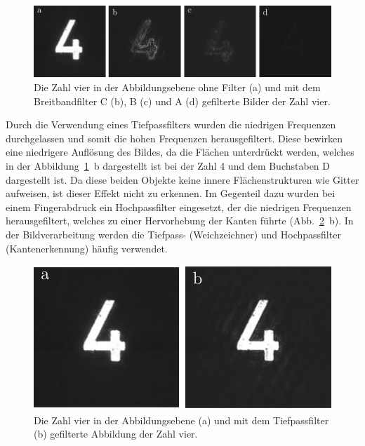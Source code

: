\begin{figure}[h]
	\centering
	\includegraphics{images/Regina/abb22.pdf}
	\caption[Zahl 4 mit Breitbandfiltern]{
		Die Zahl vier in  der Abbildungsebene ohne Filter (a) und mit dem Breitbandfilter C (b), B (c) und A (d) gefilterte Bilder der Zahl vier.
	}
	\label{fig:vier_mit_breitband}
\end{figure}

Durch die Verwendung eines Tiefpassfilters wurden die niedrigen Frequenzen durchgelassen und somit die hohen Frequenzen herausgefiltert. Diese bewirken eine niedrigere Auflösung des
Bildes, da die Flächen unterdrückt werden, welches in der Abbildung~\ref{fig:vier_mit_breitband}~b dargestellt ist bei der Zahl 4 und dem Buchstaben D dargestellt ist. Da diese beiden Objekte keine innere Flächenstrukturen wie Gitter aufweisen, ist dieser Effekt nicht zu erkennen.
Im Gegenteil dazu wurden bei einem Fingerabdruck ein Hochpassfilter eingesetzt, der die niedrigen Frequenzen herausgefiltert, welches zu einer Hervorhebung der Kanten führte (Abb.~\ref{fig:vier_mit_tiefpass}~b). In der Bildverarbeitung werden die Tiefpass- (Weichzeichner) und Hochpassfilter (Kantenerkennung) häufig verwendet.

\begin{figure}[h]
	\centering
	\includegraphics{images/Regina/abb23.pdf}
	\caption[Zahl 4 mit Tiefpassfilter]{
		Die Zahl vier in der Abbildungsebene (a) und mit dem Tiefpassfilter (b) gefilterte Abbildung der Zahl vier.
	}
	\label{fig:vier_mit_tiefpass}
\end{figure}


